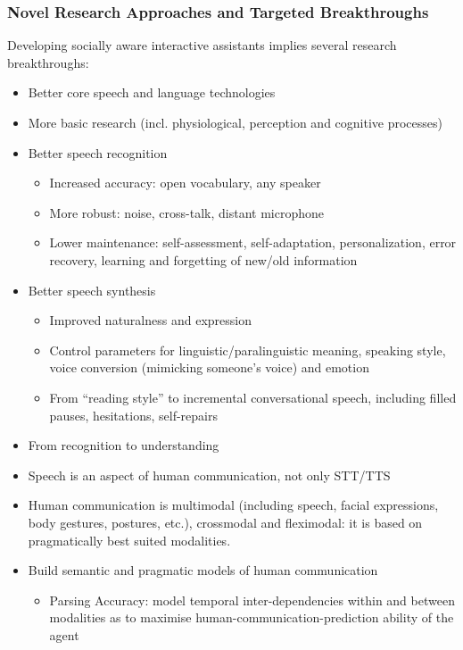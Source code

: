 \documentclass[10pt, plain]{../../metanetpaper}
\begin{document}
\begin{multicols}{2}
\subsubsection{Novel Research Approaches and Targeted Breakthroughs}
\label{sec:novel-rese-appr-pt3}

Developing socially aware interactive assistants implies several research breakthroughs:

\begin{itemize}
\item Better core speech and language technologies
\item More basic research (incl. physiological, perception and cognitive processes)
\item Better speech recognition
  \begin{itemize}
  \item Increased accuracy: open vocabulary, any speaker
  \item More robust: noise, cross-talk, distant microphone
  \item Lower maintenance: self-assessment, self-adaptation, personalization, error recovery, learning and forgetting of new/old information
  \end{itemize}
\item Better speech synthesis
  \begin{itemize}
  \item Improved naturalness and expression
  \item Control parameters for linguistic/paralinguistic meaning, speaking style, voice conversion (mimicking someone’s voice) and emotion
  \item From “reading style” to incremental conversational speech, including filled pauses, hesitations, self-repairs
  \end{itemize}
\item From recognition to understanding
\item Speech is an aspect of human communication, not only STT/TTS
\item Human communication is multimodal (including speech, facial expressions, body gestures, postures, etc.), crossmodal and fleximodal: it is based on pragmatically best suited modalities.
\item Build semantic and pragmatic models of human communication
  \begin{itemize}
  \item Parsing Accuracy: model temporal inter-dependencies within and between modalities as to maximise human-communication-prediction ability of the agent

\end{itemize}
\end{itemize}
\end{multicols}
\end{document}
